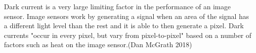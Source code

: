 Dark current is a very large limiting factor in the performance of an image sensor.  Image sensors work by generating a signal when an area of the signal has a different light level than the rest and it is able to then generate a pixel.  Dark currents "occur in every pixel, but vary from pixel-to-pixel" based on a number of factors such as heat on the image sensor.(Dan McGrath 2018)  